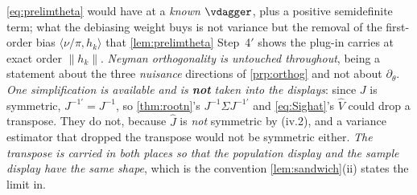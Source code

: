 \begin{lemma}[{The moment is valid, its variance is finite, its $\theta$-Jacobian is $-J$, and $J=E[\Delta Z\Delta Z']$}]
\eqref{eq:prelimtheta} would have at a \emph{known} $\vdagger$, plus a positive semidefinite term; what the
debiasing weight buys is not variance but the removal of the first-order bias
$\langle\nu/\pi,h_k\rangle$ that \cref{lem:prelimtheta} Step~4$'$ shows the plug-in carries at exact order
$\|h_k\|$. \emph{Neyman orthogonality is untouched throughout}, being a statement about the three
\emph{nuisance} directions of \cref{prp:orthog} and not about $\partial_\theta$.
\emph{One simplification is available and is \textbf{not} taken into the displays}: since $J$ is
symmetric, $J^{-1\prime}=J^{-1}$, so \cref{thm:rootn}'s $J^{-1}\Sigma J^{-1\prime}$ and
\eqref{eq:Sighat}'s $\hat V$ could drop a transpose. They do not, because $\hat J$ is \emph{not} symmetric
by \textup{(iv.2)}, and a variance estimator that dropped the transpose would not be symmetric either.
\emph{The transpose is carried in both places so that the population display and the sample display have
the same shape}, which is the convention \cref{lem:sandwich}\textup{(ii)} states the limit in.


\end{lemma}
